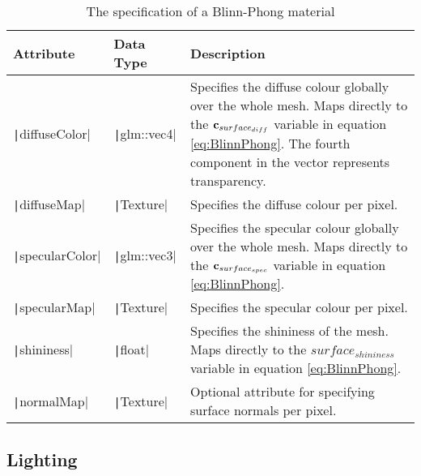 \begin{table}
\noindent\begin{tabular}{|m{7em}|m{5em}|m{29em}|}
	\hline
	\textbf{Attribute} & \textbf{Data Type} & \textbf{Description} \\
	\hline\hline
	\texttt|diffuseColor| & \texttt|glm::vec4| & Specifies the diffuse colour globally over the whole mesh. Maps directly to the \begin{math}\mathbf{c}_{surface_{diff}}\end{math} variable in equation \ref{eq:BlinnPhong}. The fourth component in the vector represents transparency. \\
	\hline
	\texttt|diffuseMap| & \texttt|Texture| & Specifies the diffuse colour per pixel. \\
	\hline
	\texttt|specularColor| & \texttt|glm::vec3| & Specifies the specular colour globally over the whole mesh. Maps directly to the \begin{math}\mathbf{c}_{surface_{spec}}\end{math} variable in equation \ref{eq:BlinnPhong}. \\
	\hline
	\texttt|specularMap| & \texttt|Texture| & Specifies the specular colour per pixel. \\
	\hline
	\texttt|shininess| & \texttt|float| & Specifies the shininess of the mesh. Maps directly to the \begin{math}surface_{shininess}\end{math} variable in equation \ref{eq:BlinnPhong}. \\
	\hline
	\texttt|normalMap| & \texttt|Texture| & Optional attribute for specifying surface normals per pixel. \\
	\hline
\end{tabular}
\caption{The specification of a Blinn-Phong material}
\label{tb:BlinnPhongMaterial}
\end{table}

\subsection{Lighting}

